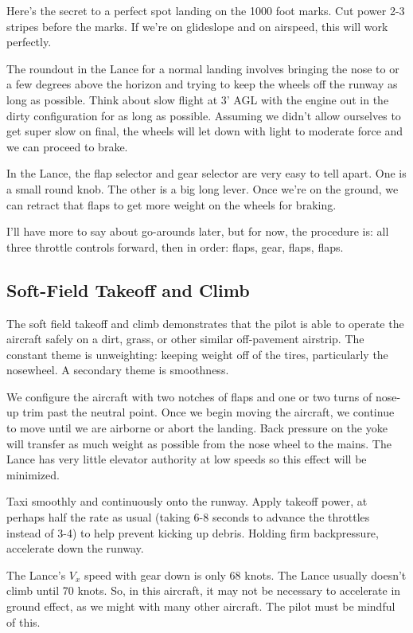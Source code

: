 Here's the secret to a perfect spot landing on the 1000 foot marks. Cut power 2-3 stripes before the marks. If we're on glideslope and on airspeed, this will work perfectly.

The roundout in the Lance for a normal landing involves bringing the nose to or a few degrees above the horizon and trying to keep the wheels off the runway as long as possible. Think about slow flight at 3' AGL with the engine out in the dirty configuration for as long as possible. Assuming we didn't allow ourselves to get super slow on final, the wheels will let down with light to moderate force and we can proceed to brake.

In the Lance, the flap selector and gear selector are very easy to tell apart. One is a small round knob. The other is a big long lever. Once we're on the ground, we can retract that flaps to get more weight on the wheels for braking.

I'll have more to say about go-arounds later, but for now, the procedure is: all three throttle controls forward, then in order: flaps, gear, flaps, flaps.

\subsection{Soft-Field Takeoff and Climb}

The soft field takeoff and climb demonstrates that the pilot is able to operate the aircraft safely on a dirt, grass, or other similar off-pavement airstrip. The constant theme is unweighting: keeping weight off of the tires, particularly the nosewheel. A secondary theme is smoothness.

We configure the aircraft with two notches of flaps and one or two turns of nose-up trim past the neutral point. Once we begin moving the aircraft, we continue to move until we are airborne or abort the landing. Back pressure on the yoke will transfer as much weight as possible from the nose wheel to the mains. The Lance has very little elevator authority at low speeds so this effect will be minimized.

Taxi smoothly and continuously onto the runway. Apply takeoff power, at perhaps half the rate as usual (taking 6-8 seconds to advance the throttles instead of 3-4) to help prevent kicking up debris. Holding firm backpressure, accelerate down the runway.

The Lance's $V_x$ speed with gear down is only 68 knots. The Lance usually doesn't climb until 70 knots. So, in this aircraft, it may not be necessary to accelerate in ground effect, as we might with many other aircraft. The pilot must be mindful of this.

